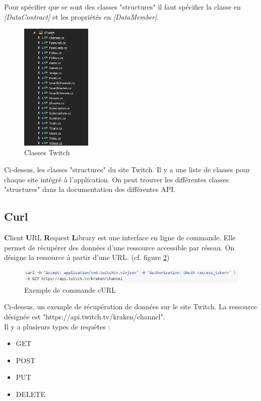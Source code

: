 \documentclass[11pt]{report} %
\begin{document}
		Pour spécifier que se sont des classes "structures" il faut spécifier la classe en \textit{[DataContract]} et les propriétés en \textit{[DataMember]}.
		
		\begin{figure}[h]
			\center
			\includegraphics[width=0.3\textwidth]{../img/STwitch.png}
			\caption{Classes Twitch}
			\label{Twitch class}
		\end{figure}
		
		Ci-dessus, les classes "structures" du site Twitch. Il y a une liste de classes pour chaque site intégré à l'application. On peut trouver les différentes classes "structures" dans la documentation des différentes API.
		
		\newpage
		\subsection{Curl}
		\textbf{C}lient \textbf{U}RL \textbf{R}equest \textbf{L}ibrary est une interface en ligne de commande. Elle permet de récupérer des données d'une ressource accessible par réseau. On désigne la ressource à partir d'une URL. (cf. figure \ref{cURL command})
		
		\begin{figure}[h]
			\center
			\includegraphics[width=1\textwidth]{../img/curl.png}
			\caption{Exemple de commande cURL}
			\label{cURL command}
		\end{figure}
		
		Ci-dessus, un exemple de récupération de données sur le site Twitch. La ressource désignée est "https://api.twitch.tv/kraken/channel".\\
		
		Il y a plusieurs types de requêtes :
		\begin{itemize}
			\item GET
			\item POST
			\item PUT
			\item DELETE
		\end{itemize}
		
\end{document}
